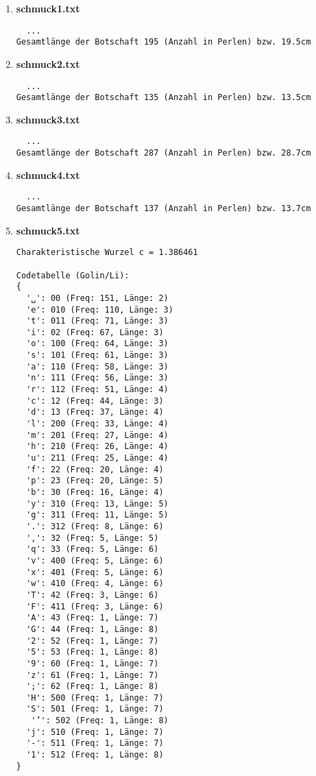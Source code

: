 \documentclass[a4paper,10pt,ngerman]{scrartcl}
\begin{document}
\begin{enumerate}
  \item \textbf{schmuck1.txt}
\begin{verbatim}
  ...
Gesamtlänge der Botschaft 195 (Anzahl in Perlen) bzw. 19.5cm
\end{verbatim}
  \item \textbf{schmuck2.txt}
\begin{verbatim}
  ...
Gesamtlänge der Botschaft 135 (Anzahl in Perlen) bzw. 13.5cm
\end{verbatim}
  \item \textbf{schmuck3.txt}
\begin{verbatim}
  ...
Gesamtlänge der Botschaft 287 (Anzahl in Perlen) bzw. 28.7cm
\end{verbatim}
  \item \textbf{schmuck4.txt}
\begin{verbatim}
  ...
Gesamtlänge der Botschaft 137 (Anzahl in Perlen) bzw. 13.7cm
\end{verbatim}
  \item \textbf{schmuck5.txt}
\begin{verbatim}
Charakteristische Wurzel c = 1.386461

Codetabelle (Golin/Li):
{
  '␣': 00 (Freq: 151, Länge: 2)
  'e': 010 (Freq: 110, Länge: 3)
  't': 011 (Freq: 71, Länge: 3)
  'i': 02 (Freq: 67, Länge: 3)
  'o': 100 (Freq: 64, Länge: 3)
  's': 101 (Freq: 61, Länge: 3)
  'a': 110 (Freq: 58, Länge: 3)
  'n': 111 (Freq: 56, Länge: 3)
  'r': 112 (Freq: 51, Länge: 4)
  'c': 12 (Freq: 44, Länge: 3)
  'd': 13 (Freq: 37, Länge: 4)
  'l': 200 (Freq: 33, Länge: 4)
  'm': 201 (Freq: 27, Länge: 4)
  'h': 210 (Freq: 26, Länge: 4)
  'u': 211 (Freq: 25, Länge: 4)
  'f': 22 (Freq: 20, Länge: 4)
  'p': 23 (Freq: 20, Länge: 5)
  'b': 30 (Freq: 16, Länge: 4)
  'y': 310 (Freq: 13, Länge: 5)
  'g': 311 (Freq: 11, Länge: 5)
  '.': 312 (Freq: 8, Länge: 6)
  ',': 32 (Freq: 5, Länge: 5)
  'q': 33 (Freq: 5, Länge: 6)
  'v': 400 (Freq: 5, Länge: 6)
  'x': 401 (Freq: 5, Länge: 6)
  'w': 410 (Freq: 4, Länge: 6)
  'T': 42 (Freq: 3, Länge: 6)
  'F': 411 (Freq: 3, Länge: 6)
  'A': 43 (Freq: 1, Länge: 7)
  'G': 44 (Freq: 1, Länge: 8)
  '2': 52 (Freq: 1, Länge: 7)
  '5': 53 (Freq: 1, Länge: 8)
  '9': 60 (Freq: 1, Länge: 7)
  'z': 61 (Freq: 1, Länge: 7)
  ';': 62 (Freq: 1, Länge: 8)
  'H': 500 (Freq: 1, Länge: 7)
  'S': 501 (Freq: 1, Länge: 7)
   '’': 502 (Freq: 1, Länge: 8)
  'j': 510 (Freq: 1, Länge: 7)
  '-': 511 (Freq: 1, Länge: 7)
  '1': 512 (Freq: 1, Länge: 8)
}


\end{verbatim}
\end{enumerate}
\end{document}
